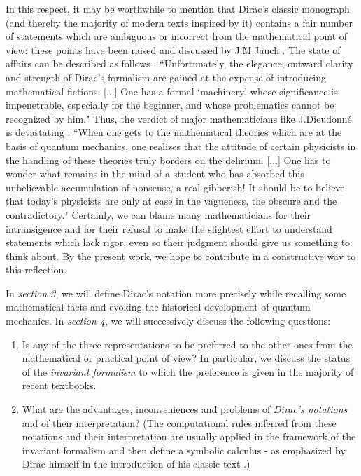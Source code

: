 \documentclass[a4wide,12pt]{report}
\begin{document}
In this respect, it may be worthwhile to mention that 
Dirac's classic monograph \cite{d} (and thereby the majority of 
modern texts inspired by it) contains a fair number of 
statements which are ambiguous or incorrect from the 
mathematical point of view: these points have been 
raised and discussed by J.M.Jauch \cite{jau}.
The state of affairs can be described as follows \cite{grau}: 
``Unfortunately, the elegance, outward clarity and strength of Dirac's
formalism  are  gained at the expense of introducing 
mathematical fictions. [...] One has a formal 
`machinery' 
whose significance is impenetrable, especially for the beginner, 
and whose problematics cannot be recognized by him." 
Thus, the verdict of major mathematicians like J.Dieudonn\'e
is devastating \cite{dieu}:
``When one gets to the mathematical theories which are at the 
basis of quantum mechanics, one realizes that the attitude of certain 
physicists in the handling of these theories truly 
borders on the delirium. [...] 
One has to wonder what remains in the mind of a student 
who has absorbed this unbelievable accumulation of nonsense,
a real gibberish! It should be to believe that today's 
physicists are only at ease in the vagueness, the obscure and 
the contradictory."
Certainly, we can blame many mathematicians for their 
intransigence and for their refusal to make the slightest 
effort to understand statements which lack rigor, 
 even so their judgment should give us something to think about.
By the present work,   
we hope to contribute in a constructive 
way to this  reflection.

In {\em section 3}, we will define Dirac's notation
more precisely while recalling some mathematical facts 
and evoking the historical development of 
quantum mechanics. 
In {\em section 4}, we will successively discuss
the following questions:
 
\begin{enumerate}
\item
 
Is any of the three representations to be preferred to the other
ones from the mathematical or practical point of view?
In particular, we discuss the status of the {\em invariant formalism}
to which the preference is given in the majority of recent
textbooks.
\item
What are the advantages, inconveniences and problems
of {\em Dirac's notations} and of their interpretation?
(The computational rules inferred from these notations and 
their interpretation are usually applied in the framework 
of the invariant formalism and then define a symbolic 
calculus - as emphasized by Dirac himself 
in the introduction of his classic text \cite{d}.) 

\end{enumerate}
 
\end{document}
